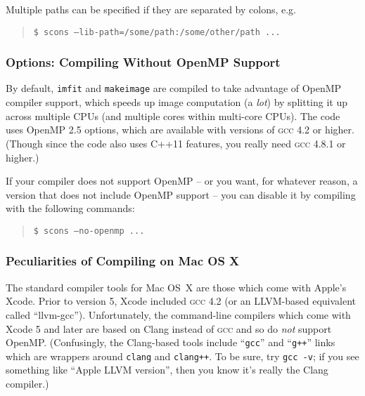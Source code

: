 \documentclass[10pt,a4paper,article]{memoir}
\newcommand{\imfitprog}{\texttt{imfit}}
\newcommand{\makeimage}{\texttt{makeimage}}
\begin{document}
Multiple paths can be specified if they are separated by colons, e.g.
\begin{quote}
\texttt{\$ scons --lib-path=/some/path:/some/other/path ...} \\
\end{quote}



\subsubsection{Options: Compiling Without OpenMP Support}

By default, \imfitprog{} and \makeimage{} are compiled to take advantage
of OpenMP compiler support, which speeds up image computation (a
\textit{lot}) by splitting it up across multiple CPUs (and multiple
cores within multi-core CPUs). The code uses OpenMP 2.5 options, which
are available with versions of \textsc{gcc} 4.2 or higher. (Though since
the code also uses C++11 features, you really need \textsc{gcc} 4.8.1 or
higher.)

If your compiler
does not support OpenMP -- or you want, for whatever reason, a version
that does not include OpenMP support -- you can disable it by compiling
with the following commands:
\begin{quote}
\texttt{\$ scons --no-openmp ...}
\end{quote}


\subsubsection{Peculiarities of Compiling on Mac OS X}

The standard compiler tools for Mac OS~X are those which come with
Apple's Xcode. Prior to version 5, Xcode included \textsc{gcc} 4.2 (or
an LLVM-based equivalent called ``llvm-gcc''). Unfortunately, the
command-line compilers which come with Xcode 5 and later are based on
Clang instead of \textsc{gcc} and so do \textit{not} support OpenMP.
(Confusingly, the Clang-based tools include ``\texttt{gcc}'' and
``\texttt{g++}'' links which are wrappers around \texttt{clang} and
\texttt{clang++}. To be sure, try \texttt{gcc -v}; if you see something
like ``Apple LLVM version'', then you know it's really the Clang
compiler.)
\end{document}
